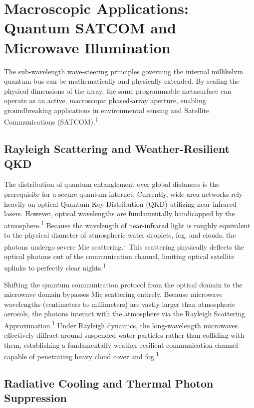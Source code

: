 \documentclass[11pt, a4paper]{article}
\begin{document}
\section*{Macroscopic Applications: Quantum SATCOM and Microwave Illumination}

The sub-wavelength wave-steering principles governing the internal millikelvin quantum bus can be mathematically and physically extended. By scaling the physical dimensions of the array, the same programmable metasurface can operate as an active, macroscopic phased-array aperture, enabling groundbreaking applications in environmental sensing and Satellite Communications (SATCOM).\textsuperscript{1}

\subsection*{Rayleigh Scattering and Weather-Resilient QKD}

The distribution of quantum entanglement over global distances is the prerequisite for a secure quantum internet. Currently, wide-area networks rely heavily on optical Quantum Key Distribution (QKD) utilizing near-infrared lasers. However, optical wavelengths are fundamentally handicapped by the atmosphere.\textsuperscript{1} Because the wavelength of near-infrared light is roughly equivalent to the physical diameter of atmospheric water droplets, fog, and clouds, the photons undergo severe Mie scattering.\textsuperscript{1} This scattering physically deflects the optical photons out of the communication channel, limiting optical satellite uplinks to perfectly clear nights.\textsuperscript{1}

Shifting the quantum communication protocol from the optical domain to the microwave domain bypasses Mie scattering entirely. Because microwave wavelengths (centimeters to millimeters) are vastly larger than atmospheric aerosols, the photons interact with the atmosphere via the Rayleigh Scattering Approximation.\textsuperscript{1} Under Rayleigh dynamics, the long-wavelength microwaves effectively diffract around suspended water particles rather than colliding with them, establishing a fundamentally weather-resilient communication channel capable of penetrating heavy cloud cover and fog.\textsuperscript{1}

\subsection*{Radiative Cooling and Thermal Photon Suppression}
\end{document}
